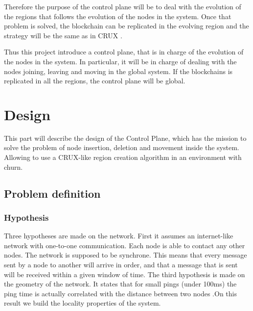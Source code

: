 \documentclass[a4paper,11pt,oneside]{report}
\begin{document}
Therefore the purpose of the control plane will be to deal with the evolution
of the regions that follows the evolution of the nodes in the system. Once that
problem is solved, the blockchain can be replicated in the evolving region and
the strategy will be the same as in CRUX \cite{Basescu2014}. 

Thus this project introduce a control plane, that is in charge of the evolution
of the nodes in the system. In particular, it will be in charge of dealing with
the nodes joining, leaving and moving in the global system. If the blockchains
is replicated in all the regions, the control plane will be global. 

\chapter{Design} \label{chap:Design}

This part will describe the design of the Control Plane, which has the mission
to solve the problem of node insertion, deletion and movement inside the
system. Allowing to use a CRUX-like region creation algorithm in an environment
with churn. 

\section{Problem definition}

\subsection{Hypothesis} Three hypotheses are made on the network. First it
assumes an internet-like network with one-to-one communication. Each node is
able to contact any other nodes. The network is supposed to be synchrone. This
means that every message sent by a node to another will arrive in order, and
that a message that is sent will be received within a given window of time. The
third hypothesis is made on the geometry of the network. It states that for
small pings (under 100ms) the ping time is actually correlated with the
distance between two nodes \cite{Seibert2014} .On this result we build the
locality properties of the system. 
\end{document}

